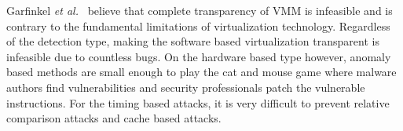Garfinkel {\em et al.}~\cite{garfinkel2007} believe that complete
transparency of VMM is infeasible and is contrary to the fundamental limitations
of virtualization technology.
Regardless of the detection type, making the software based virtualization transparent is infeasible due to countless bugs. On the hardware based type however, anomaly based methods are small enough to play the cat and mouse game where malware authors find vulnerabilities and security professionals patch the vulnerable instructions. For the timing based attacks, it is very difficult to prevent relative comparison attacks and cache based attacks.

